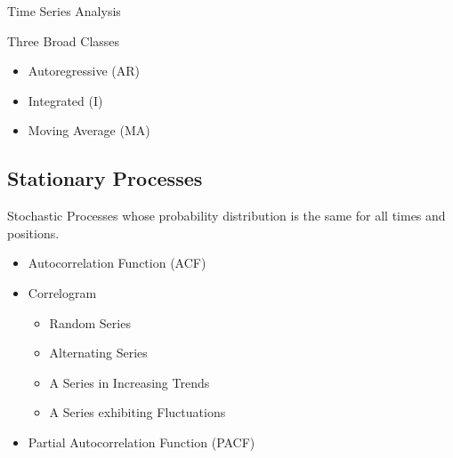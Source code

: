 Time Series Analysis
 

Three Broad Classes

\begin{itemize}
\item Autoregressive (AR)
\item Integrated (I)
\item Moving Average (MA) 
\end{itemize}


\subsection*{Stationary Processes}
Stochastic Processes whose probability distribution is the same for all times and positions.

\begin{itemize}
\item Autocorrelation Function (ACF)
\item Correlogram
	\begin{itemize}
	\item Random Series
	\item Alternating Series
	\item A Series in Increasing Trends
	\item A Series exhibiting Fluctuations
	\end{itemize}
\item Partial Autocorrelation Function (PACF)
\end{itemize}
